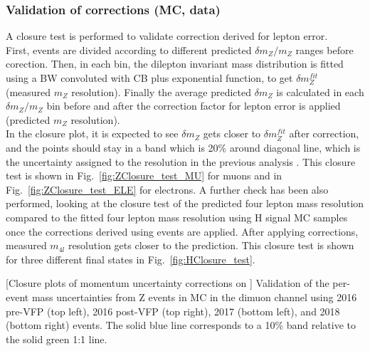 \subsubsection{Validation of corrections (MC, data)}
\label{sec:ClosureTest}
A closure test is performed to validate correction derived for lepton \PT error. \\
First, events are divided according to different predicted $\delta m_{Z}/m_{Z}$ ranges before corection. 
Then, in each bin, the dilepton invariant mass distribution is fitted using a BW convoluted with CB 
plus exponential function, to get $\delta m_{Z}^{fit}$ (measured $m_{Z}$ resolution). Finally 
the average predicted $\delta m_{Z}$ is calculated in each $\delta m_{Z}/m_{Z}$ bin before and after the 
correction factor for lepton \PT error is applied (predicted $m_{Z}$ resolution). \\
In the closure plot, it is expected to see $\delta m_{Z}$ gets closer to $\delta m_{Z}^{fit}$ 
after correction, and the points should stay in a band which is 20\% around diagonal line, which 
is the uncertainty assigned to the resolution in the previous analysis \cite{HIG_16_041}. 
This closure test is shown in Fig.~\ref{fig:ZClosure_test_MU} for muons and in Fig.~\ref{fig:ZClosure_test_ELE} 
for electrons. A further check has been also performed, looking at the closure test of the predicted four lepton mass 
resolution compared to the fitted four lepton mass resolution using H signal MC samples once the 
corrections derived using \PZ events are applied. After applying corrections, measured $m_{4l}$ 
resolution gets closer to the prediction. This closure test is shown for three different 
final states in Fig.~\ref{fig:HClosure_test}.
\begin{multiFigure}
    \centering
        [Closure plots of momentum uncertainty corrections on \ztomumu]
        {Validation of the per-event mass uncertainties from Z events in MC in the dimuon channel using 2016 pre-VFP (top left), 2016 post-VFP (top right), 2017 (bottom left), and 2018 (bottom right) events.
		The solid blue line corresponds to a 10\% band relative to the solid green 1:1 line.}
    \label{fig:ZClosure_test_MU}
\end{multiFigure}
